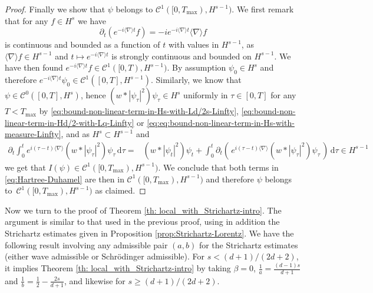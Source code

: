 \documentclass[12pt]{article}
\theoremstyle{plain}
\begin{document}
\begin{proof}
Finally we show that $\psi$ belongs to $\mathcal{C}^{1}([0,T_{\max}),H^{s-1})$.
We first remark that for any $f\in H^{s}$ we have 
\[
\partial_{t}(e^{-i\langle\nabla\rangle t}f)=-ie^{-i\langle\nabla\rangle t}\langle\nabla\rangle f
\]
is continuous and bounded as a function of $t$ with values in $H^{s-1}$,
as $\langle\nabla\rangle f\in H^{s-1}$ and $t\mapsto e^{-i\langle\nabla\rangle t}$
is strongly continuous and bounded on $H^{s-1}$. We have then found $e^{-i\langle\nabla\rangle t}f\in \mathcal{C}^{1}([0,T),H^{s-1})$.
By assumption $\psi_{0}\in H^{s}$ and therefore $e^{-i\langle\nabla\rangle t}\psi_{0}\in \mathcal{C}^{1}([0,T],H^{s-1})$.
Similarly, we know that $\psi\in \mathcal{C}^{0}([0,T],H^{s})$, hence $(w*|\psi_{\tau}|^{2})\psi_{\tau}\in H^{s}$
uniformly in $\tau\in[0,T]$ for any $T<T_{\max}$ by \eqref{eq:bound-non-linear-term-in-Hs-with-Ld/2s-Linfty}, \eqref{eq:bound-non-linear-term-in-Hd/2-with-Lq-Linfty}
or \eqref{eq:eq:bound-non-linear-term-in-Hs-with-measure-Linfty},
and as $H^{s}\subset H^{s-1}$ and
\begin{align*}
\partial_{t}\int_{0}^{t}e^{i(\tau-t)\langle\nabla\rangle}(w*|\psi_{\tau}|^{2})\psi_{\tau}\,\mathrm{d}\tau= & (w*|\psi_{t}|^{2})\psi_{t}+\int_{0}^{t}\partial_{t}(\,e^{i(\tau-t)\langle\nabla\rangle}(w*|\psi_{\tau}|^{2})\psi_{\tau}\,)\,\mathrm{d}\tau\in H^{s-1}
\end{align*}
we get that $I(\psi)\in \mathcal{C}^{1}([0,T_{\max}),H^{s-1})$. We conclude
that both terms in \eqref{eq:Hartree-Duhamel} are then in $\mathcal{C}^{1}([0,T_{\max}),H^{s-1})$
and therefore $\psi$ belongs to~$\mathcal{C}^{1}([0,T_{\max}),H^{s-1})$ as
claimed.
\end{proof}




Now we turn to the proof of  Theorem \ref{th: local_with_Strichartz-intro}. The argument is similar to that used in the previous proof, using in addition the Strichartz estimates given in Proposition \ref{prop:Strichartz-Lorentz}. We have the following result involving any admissible pair $(a,b)$ for the Strichartz estimates (either wave admissible or Schrödinger admissible). For $s<(d+1)/(2d+2)$, it implies  Theorem \ref{th: local_with_Strichartz-intro} by taking $\beta=0$, $\frac1a=\frac{(d-1)s}{d+1}$ and $\frac1b=\frac12-\frac{2s}{d+1}$, and likewise for $s\ge(d+1)/(2d+2)$.

 
\end{document}
